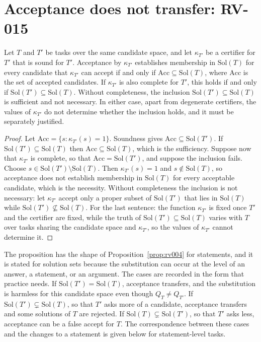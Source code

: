 \section{Acceptance does not transfer: RV-015}

\begin{proposition}
\label{prop:rv015}
Let $T$ and $T'$ be tasks over the same candidate space, and let $\kappa_{T'}$ be a certifier for $T'$ that is sound for $T'$. Acceptance by $\kappa_{T'}$ establishes membership in $\mathrm{Sol}(T)$ for every candidate that $\kappa_{T'}$ can accept if and only if $\mathrm{Acc}\subseteq\mathrm{Sol}(T)$, where $\mathrm{Acc}$ is the set of accepted candidates. If $\kappa_{T'}$ is also complete for $T'$, this holds if and only if $\mathrm{Sol}(T') \subseteq \mathrm{Sol}(T)$. Without completeness, the inclusion $\mathrm{Sol}(T')\subseteq\mathrm{Sol}(T)$ is sufficient and not necessary. In either case, apart from degenerate certifiers, the values of $\kappa_{T'}$ do not determine whether the inclusion holds, and it must be separately justified.
\end{proposition}

\begin{proof}
Let $\mathrm{Acc} = \{s : \kappa_{T'}(s) = 1\}$. Soundness gives $\mathrm{Acc} \subseteq \mathrm{Sol}(T')$. If $\mathrm{Sol}(T') \subseteq \mathrm{Sol}(T)$ then $\mathrm{Acc} \subseteq \mathrm{Sol}(T)$, which is the sufficiency. Suppose now that $\kappa_{T'}$ is complete, so that $\mathrm{Acc} = \mathrm{Sol}(T')$, and suppose the inclusion fails. Choose $s \in \mathrm{Sol}(T') \setminus \mathrm{Sol}(T)$. Then $\kappa_{T'}(s) = 1$ and $s \notin \mathrm{Sol}(T)$, so acceptance does not establish membership in $\mathrm{Sol}(T)$ for every acceptable candidate, which is the necessity. Without completeness the inclusion is not necessary: let $\kappa_{T'}$ accept only a proper subset of $\mathrm{Sol}(T')$ that lies in $\mathrm{Sol}(T)$ while $\mathrm{Sol}(T')\not\subseteq\mathrm{Sol}(T)$. For the last sentence: the function $\kappa_{T'}$ is fixed once $T'$ and the certifier are fixed, while the truth of $\mathrm{Sol}(T')\subseteq\mathrm{Sol}(T)$ varies with $T$ over tasks sharing the candidate space and $\kappa_{T'}$, so the values of $\kappa_{T'}$ cannot determine it.
\end{proof}

The proposition has the shape of Proposition~\ref{prop:rv004} for statements, and it is stated for solution sets because the substitution can occur at the level of an answer, a statement, or an argument. The cases are recorded in the form that practice needs. If $\mathrm{Sol}(T')=\mathrm{Sol}(T)$, acceptance transfers, and the substitution is harmless for this candidate space even though $Q_T \ne Q_{T'}$. If $\mathrm{Sol}(T')\subsetneq\mathrm{Sol}(T)$, so that $T'$ asks more of a candidate, acceptance transfers and some solutions of $T$ are rejected. If $\mathrm{Sol}(T)\subsetneq\mathrm{Sol}(T')$, so that $T'$ asks less, acceptance can be a false accept for $T$. The correspondence between these cases and the changes to a statement is given below for statement-level tasks.

